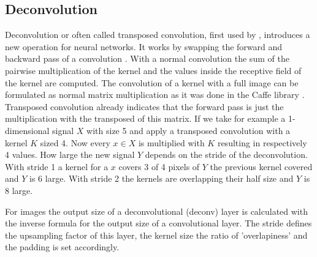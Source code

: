 \subsection{Deconvolution} %
\label{sub:conepts:fcn:deconv}
Deconvolution or often called transposed convolution, first used by \citet{zeiler_deconvolutional_2010}, introduces a new operation for neural networks. It works by swapping the forward and backward pass of a convolution \citep{dumoulin_guide_2016}. With a normal convolution the sum of the pairwise multiplication of the kernel and the values inside the receptive field of the kernel are computed. The convolution of a kernel with a full image can be formulated as normal matrix multiplication as it was done in the Caffe library \citep{jia2014caffe}. Transposed convolution already indicates that the forward pass is just the multiplication with the transposed  of this matrix. If we take for example a 1-dimensional signal $X$ with size 5 and apply a transposed convolution with a kernel $K$ sized 4. Now every $x\in X$ is multiplied with $K$ resulting in respectively 4 values. How large the new signal $Y$ depends on the stride of the deconvolution. With stride 1 a kernel for a $x$ covers 3 of 4 pixels of $Y$ the previous kernel covered and $Y$ is 6 large. With stride 2 the kernels are overlapping their half size and $Y$ is 8 large.

For images the output size of a deconvolutional (deconv) layer is calculated with the inverse formula for the output size of a convolutional layer. The stride defines the upsampling factor of this layer, the kernel size the ratio of 'overlapiness' and the padding is set accordingly.

